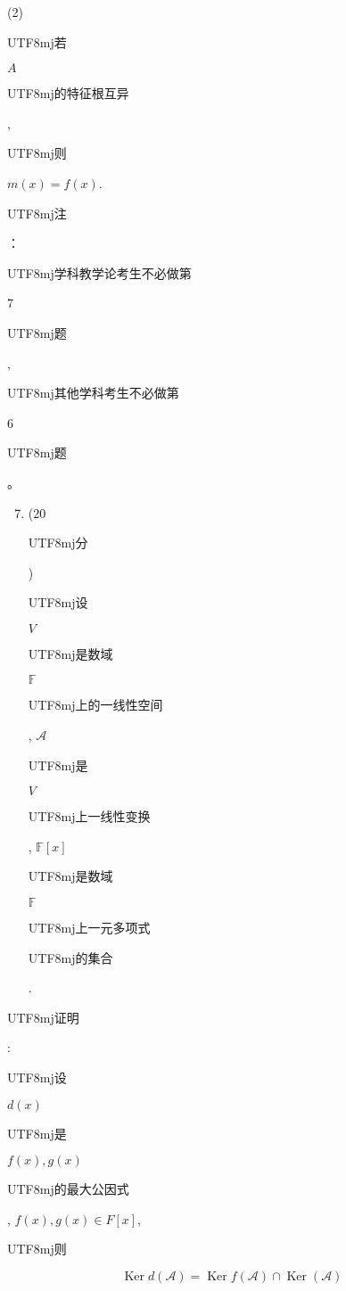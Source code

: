 \documentclass[10pt]{article}
\begin{document}
(2) \begin{CJK}{UTF8}{mj}若\end{CJK} $A$ \begin{CJK}{UTF8}{mj}的特征根互异\end{CJK}, \begin{CJK}{UTF8}{mj}则\end{CJK} $m(x)=f(x)$.

\begin{CJK}{UTF8}{mj}注\end{CJK}：\begin{CJK}{UTF8}{mj}学科教学论考生不必做第\end{CJK} 7 \begin{CJK}{UTF8}{mj}题\end{CJK}, \begin{CJK}{UTF8}{mj}其他学科考生不必做第\end{CJK} 6 \begin{CJK}{UTF8}{mj}题\end{CJK}。

\begin{enumerate}
  \setcounter{enumi}{6}
  \item (20 \begin{CJK}{UTF8}{mj}分\end{CJK}) \begin{CJK}{UTF8}{mj}设\end{CJK} $V$ \begin{CJK}{UTF8}{mj}是数域\end{CJK} $\mathbb{F}$ \begin{CJK}{UTF8}{mj}上的一线性空间\end{CJK}, $\mathscr{A}$ \begin{CJK}{UTF8}{mj}是\end{CJK} $V$ \begin{CJK}{UTF8}{mj}上一线性变换\end{CJK}, $\mathbb{F}[x]$ \begin{CJK}{UTF8}{mj}是数域\end{CJK} $\mathbb{F}$ \begin{CJK}{UTF8}{mj}上一元多项式\end{CJK} \begin{CJK}{UTF8}{mj}的集合\end{CJK}.
\end{enumerate}
\begin{CJK}{UTF8}{mj}证明\end{CJK}: \begin{CJK}{UTF8}{mj}设\end{CJK} $d(x)$ \begin{CJK}{UTF8}{mj}是\end{CJK} $f(x), g(x)$ \begin{CJK}{UTF8}{mj}的最大公因式\end{CJK}, $f(x), g(x) \in F[x]$, \begin{CJK}{UTF8}{mj}则\end{CJK}
$$
\operatorname{Ker} d(\mathscr{A})=\operatorname{Ker} f(\mathscr{A}) \cap \operatorname{Ker}(\mathscr{A})
$$
\end{document}
